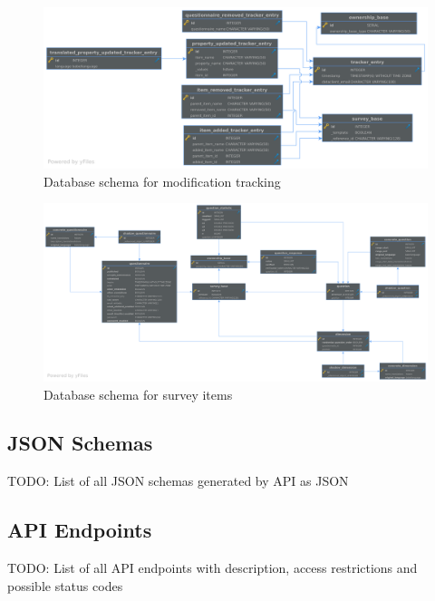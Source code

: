 \documentclass[a4paper,11pt]{article}
\begin{document}
                \begin{figure}[H]
                    \centering
                    \includegraphics[width=\textwidth]{schema-tracking}
                    \caption{Database schema for modification tracking}
                    \label{fig:schema-tracking}
                \end{figure}

                \begin{landscape}
                    \begin{figure}[H]
                        \centering
                        \includegraphics[width=1.35\textwidth]{schema-surveybase}
                        \caption{Database schema for survey items}
                        \label{fig:schema-surveybase}
                    \end{figure}
                \end{landscape}

            \subsection{JSON Schemas}
                TODO: List of all JSON schemas generated by API as JSON
            \subsection{API Endpoints}
                TODO: List of all API endpoints with description, access restrictions and possible status codes
\end{document}
